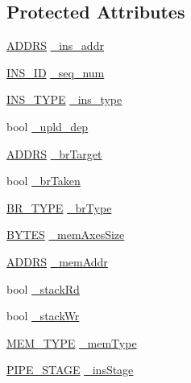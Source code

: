 \subsection*{Protected Attributes}
\begin{DoxyCompactItemize}
\item 
\hyperlink{binaryTranslator_2frontend_2stInstruction_8h_a7ea74bb9ffd2e4d41550ae2383dd25bc}{ADDRS} \hyperlink{classdynInstruction_a2de61048d8f382933606e1582a82ea16}{\_\-ins\_\-addr}
\item 
\hyperlink{global_2global_8h_a1883c47d0023d0f200e1d86eced6a070}{INS\_\-ID} \hyperlink{classdynInstruction_a83cdfa461d7b1c12c4f9d9d0c8b9d630}{\_\-seq\_\-num}
\item 
\hyperlink{binaryTranslator_2global_8h_a7aead736a07eaf25623ad7bfa1f0ee2d}{INS\_\-TYPE} \hyperlink{classdynInstruction_a85cf6f4254516ea4286cc5d63bee54e6}{\_\-ins\_\-type}
\item 
bool \hyperlink{classdynInstruction_a68be14704fc772703ec5c2996ab157e6}{\_\-upld\_\-dep}
\item 
\hyperlink{binaryTranslator_2frontend_2stInstruction_8h_a7ea74bb9ffd2e4d41550ae2383dd25bc}{ADDRS} \hyperlink{classdynInstruction_a27c4e2916461836ac4da8cba3174c72e}{\_\-brTarget}
\item 
bool \hyperlink{classdynInstruction_a572c8b5ba4b766337e601fe97b6dbba8}{\_\-brTaken}
\item 
\hyperlink{global_2global_8h_a6e7345a10544e77c7dfe6c4e5cb3ec97}{BR\_\-TYPE} \hyperlink{classdynInstruction_a2f263c6a90a6d1abcda8a3bb612c61ba}{\_\-brType}
\item 
\hyperlink{global_2global_8h_a430d9e51ff815ddfce06905ae7392e83}{BYTES} \hyperlink{classdynInstruction_a2064414260dc5c11e2b6af0f9974bec1}{\_\-memAxesSize}
\item 
\hyperlink{binaryTranslator_2frontend_2stInstruction_8h_a7ea74bb9ffd2e4d41550ae2383dd25bc}{ADDRS} \hyperlink{classdynInstruction_a43307923466ce126bedd260e6fc3903a}{\_\-memAddr}
\item 
bool \hyperlink{classdynInstruction_ad6650905d355b9bd11821572eb5c449b}{\_\-stackRd}
\item 
bool \hyperlink{classdynInstruction_a8ae8b2d882d79e89310ebaedb9b6408f}{\_\-stackWr}
\item 
\hyperlink{global_2global_8h_a40bc49627faaf5adeed28388c6ffae9c}{MEM\_\-TYPE} \hyperlink{classdynInstruction_aa0a3ae202f13e486fe998bc7f4a600d3}{\_\-memType}
\item 
\hyperlink{global_2global_8h_a015eb90e0de9f16e87bd149d4b9ce959}{PIPE\_\-STAGE} \hyperlink{classdynInstruction_ac7c0381d28c31b2f74785407a8098bd4}{\_\-insStage}

\end{DoxyCompactItemize}
